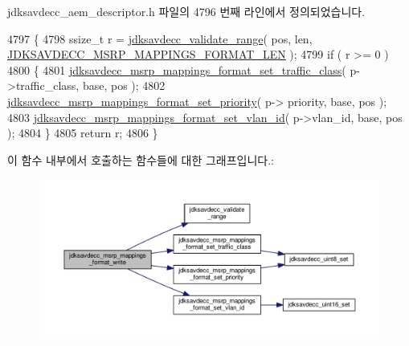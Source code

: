 jdksavdecc\+\_\+aem\+\_\+descriptor.\+h 파일의 4796 번째 라인에서 정의되었습니다.


\begin{DoxyCode}
4797 \{
4798     ssize\_t r = \hyperlink{group__util_ga9c02bdfe76c69163647c3196db7a73a1}{jdksavdecc\_validate\_range}( pos, len, 
      \hyperlink{group__msrp__mappings__format_ga4ec95c1f1d0677ac9a1f6edae29fad0c}{JDKSAVDECC\_MSRP\_MAPPINGS\_FORMAT\_LEN} );
4799     \textcolor{keywordflow}{if} ( r >= 0 )
4800     \{
4801         \hyperlink{group__msrp__mappings__format_ga9c9a6072c62d4b48cf33c1b79b0d305e}{jdksavdecc\_msrp\_mappings\_format\_set\_traffic\_class}(
       p->traffic\_class, base, pos );
4802         \hyperlink{group__msrp__mappings__format_gadd45e131f83c4fe001f929c730c7dbaa}{jdksavdecc\_msrp\_mappings\_format\_set\_priority}( p->
      priority, base, pos );
4803         \hyperlink{group__msrp__mappings__format_ga1152bffb44746ced7445236ca5aa5bf8}{jdksavdecc\_msrp\_mappings\_format\_set\_vlan\_id}( p->vlan\_id,
       base, pos );
4804     \}
4805     \textcolor{keywordflow}{return} r;
4806 \}
\end{DoxyCode}


이 함수 내부에서 호출하는 함수들에 대한 그래프입니다.\+:
\nopagebreak
\begin{figure}[H]
\begin{center}
\leavevmode
\includegraphics[width=350pt]{group__msrp__mappings__format_gadc1f271d0e1ddcdfd3a6aa38bbc3cd73_cgraph}
\end{center}
\end{figure}


